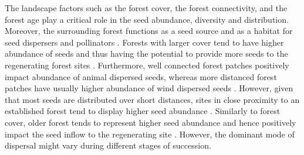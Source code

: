 

The landscape factors such as the forest cover, the forest connectivity, and the forest age play a critical role in the seed abundance, diversity and distribution. Moreover, the surrounding forest functions as a seed source and as a habitat for seed dispersers and pollinators \citep{hordijkLandUseHistory2024, arroyo-rodriguezMultipleSuccessionalPathways2017}. Forests with larger cover tend to have higher abundance of seeds and thus having the potential to provide more seeds to the regenerating forest sites \citep{poorterSuccessionalTheories2023}. Furthermore, well connected forest patches positively impact abundance of animal dispersed seeds, whereas more distanced forest patches have usually higher abundance of wind dispersed seeds \citep{dentUnitingNicheDifferentiation2021}. However, given that most seeds are distributed over short distances, sites in close proximity to an established forest tend to display higher seed abundance \citep{chazdonSecondGrowthPromise2014, hordijkLandUseHistory2024}. Similarly to forest cover, older forest tends to represent higher seed abundance and hence positively impact the seed inflow to the regenerating site \citep{huancanunezSeedrainsuccessionalFeedbacksWet2021}. However, the dominant mode of dispersal might vary during different stages of succession. 

